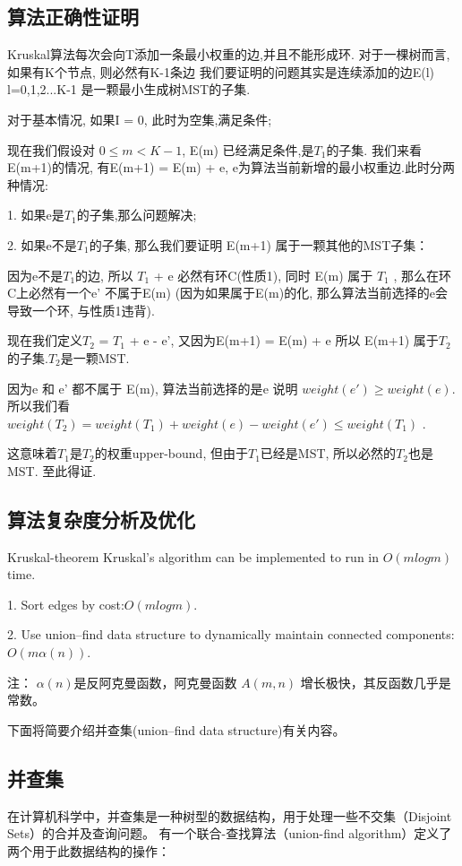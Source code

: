 \subsection{算法正确性证明}
Kruskal算法每次会向T添加一条最小权重的边,并且不能形成环.
对于一棵树而言, 如果有K个节点, 则必然有K-1条边
我们要证明的问题其实是连续添加的边E(l) l=0,1,2...K-1 是一颗最小生成树MST的子集.

对于基本情况, 如果I = 0, 此时为空集,满足条件;

现在我们假设对 $0 \leq m < K-1$, E(m) 已经满足条件,是$T_1$的子集. 我们来看 E(m+1)的情况,
有E(m+1) = E(m) + {e}, e为算法当前新增的最小权重边.此时分两种情况:

1. 如果{e}是$T_1$的子集,那么问题解决;

2. 如果{e}不是$T_1$的子集, 那么我们要证明 E(m+1) 属于一颗其他的MST子集：

因为{e}不是$T_1$的边, 所以 $T_1$ + {e} 必然有环C(性质1), 同时 E(m) 属于 $T_1$ ,
那么在环C上必然有一个{e'} 不属于E(m) (因为如果属于E(m)的化, 那么算法当前选择的{e}会导致一个环, 与性质1违背).

现在我们定义$T_2$ = $T_1$ + {e} - {e'}, 又因为E(m+1) = E(m) + {e} 所以 E(m+1) 属于$T_2$的子集.$T_2$是一颗MST.

因为{e} 和 {e'} 都不属于 E(m), 算法当前选择的是{e} 说明 $weight({e'}) \geq weight({e})$.
所以我们看$weight(T_2) = weight(T_1) + weight({e}) - weight({e'}) \leq weight(T_1)$ .

这意味着$T_1$是$T_2$的权重upper-bound, 但由于$T_1$已经是MST, 所以必然的$T_2$也是MST. 至此得证.

\subsection{算法复杂度分析及优化}
\begin{theorem}{}{Kruskal-theorem}
	Kruskal’s algorithm can be implemented to run in $O(m log m)$ time.
\end{theorem}

1. Sort edges by cost:$O(m log m)$.

2. Use union–find data structure to dynamically maintain connected components:$O(m \alpha (n))$.

注： $\alpha (n)$是反阿克曼函数，阿克曼函数 $A(m,n)$ 增长极快，其反函数几乎是常数。

下面将简要介绍并查集(union–find data structure)有关内容。
\subsection{并查集}
在计算机科学中，并查集是一种树型的数据结构，用于处理一些不交集（Disjoint Sets）的合并及查询问题。
有一个联合-查找算法（union-find algorithm）定义了两个用于此数据结构的操作：

